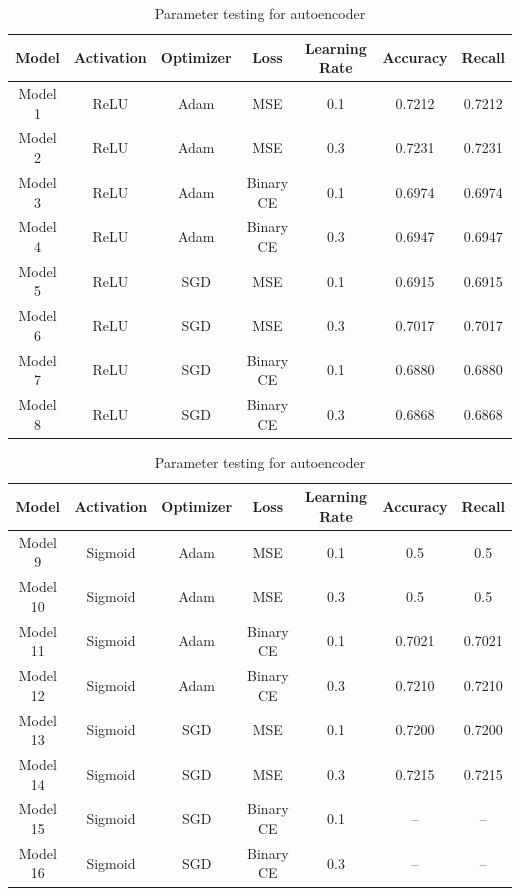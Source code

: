 \begin{table}[H]
    \centering
    \begin{tabular}{|c|c|c|c|c|c|c|}
        \hline
        \rowcolor{lightgreen}
        \textbf{Model} & \textbf{Activation} & \textbf{Optimizer} & \textbf{Loss} & \textbf{Learning Rate} & \textbf{Accuracy} & \textbf{Recall} \\
        \hline
        Model 1 & ReLU & Adam & MSE & 0.1 & 0.7212 & 0.7212 \\
        \hline
        Model 2 & ReLU & Adam & MSE & 0.3 & 0.7231 & 0.7231 \\
        \hline
        Model 3 & ReLU & Adam & Binary CE & 0.1 & 0.6974 & 0.6974 \\
        \hline
        Model 4 & ReLU & Adam & Binary CE & 0.3 & 0.6947 & 0.6947 \\
        \hline
        Model 5 & ReLU & SGD & MSE & 0.1 & 0.6915 & 0.6915 \\
        \hline
        Model 6 & ReLU & SGD & MSE & 0.3 & 0.7017 & 0.7017 \\
        \hline
        Model 7 & ReLU & SGD & Binary CE & 0.1 & 0.6880 & 0.6880 \\
        \hline
        Model 8 & ReLU & SGD & Binary CE & 0.3 & 0.6868 & 0.6868 \\
        \hline
    \end{tabular}
    \caption{Parameter testing for autoencoder}
    \label{tab:op1}
\end{table}
\begin{table}[H]
    \centering
    \begin{tabular}{|c|c|c|c|c|c|c|}
        \hline
        \rowcolor{lightgreen}
        \textbf{Model} & \textbf{Activation} & \textbf{Optimizer} & \textbf{Loss} & \textbf{Learning Rate} & \textbf{Accuracy} & \textbf{Recall} \\
        \hline
        Model 9 & Sigmoid & Adam & MSE & 0.1 & 0.5 & 0.5 \\
        \hline
        Model 10 & Sigmoid & Adam & MSE & 0.3 & 0.5 & 0.5 \\
        \hline
        Model 11 & Sigmoid & Adam & Binary CE & 0.1 & 0.7021 & 0.7021 \\
        \hline
        Model 12 & Sigmoid & Adam & Binary CE & 0.3 & 0.7210 & 0.7210 \\
        \hline
        Model 13 & Sigmoid & SGD & MSE & 0.1 & 0.7200 & 0.7200 \\
        \hline
        Model 14 & Sigmoid & SGD & MSE & 0.3 & 0.7215 & 0.7215 \\
        \hline
        Model 15 & Sigmoid & SGD & Binary CE & 0.1 & -- & -- \\
        \hline
        Model 16 & Sigmoid & SGD & Binary CE & 0.3 & -- & -- \\
        \hline
    \end{tabular}
    \caption{Parameter testing for autoencoder}
    \label{tab:op2}
\end{table}
